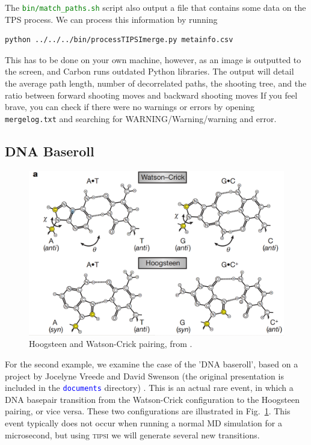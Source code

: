\documentclass[]{article}
\begin{document}
The \textcolor{green}{\texttt{bin/match\_paths.sh}} script also output a file that contains some data on the TPS process. We can process this information by running
%
\begin{lstlisting}
python ../../../bin/processTIPSImerge.py metainfo.csv
\end{lstlisting}
% 
This has to be done on your own machine, however, as an image is outputted to the screen, and Carbon runs outdated Python libraries. The output will detail the average path length, number of decorrelated paths, the shooting tree, and the ratio between forward shooting moves and backward shooting moves If you feel brave, you can check if there were no warnings or errors by opening \texttt{mergelog.txt} and searching for WARNING/Warning/warning and error. 

\newpage

\subsection*{DNA Baseroll}

\begin{figure}[ht]
    \centering
    \includegraphics[scale=0.25]{images/pairing.png}
    \caption{Hoogsteen and Watson-Crick pairing, from \cite{nikolova2011transient}.}
    \label{fig:dnabr}
\end{figure}

For the second example, we examine the case of the 'DNA baseroll', based on a project by Jocelyne Vreede and David Swenson (the original presentation is included in the \texttt{\textcolor{blue}{documents}} directory) \cite{dnabr}. This is an actual rare event, in which a DNA basepair transition from the Watson-Crick configuration to the Hoogsteen pairing, or vice versa. These two configurations are illustrated in Fig.~\ref{fig:dnabr}. This event typically does not occur when running a normal MD simulation for a microsecond, but using \textsc{tipsi} we will generate several new transitions.
\end{document}
